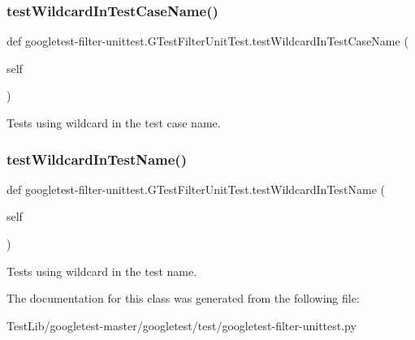 \subsubsection{\texorpdfstring{test\+Wildcard\+In\+Test\+Case\+Name()}{testWildcardInTestCaseName()}}
{\footnotesize\ttfamily def googletest-\/filter-\/unittest.\+G\+Test\+Filter\+Unit\+Test.\+test\+Wildcard\+In\+Test\+Case\+Name (\begin{DoxyParamCaption}\item[{}]{self }\end{DoxyParamCaption})}

\begin{DoxyVerb}Tests using wildcard in the test case name.\end{DoxyVerb}
 \mbox{\label{classgoogletest-filter-unittest_1_1GTestFilterUnitTest_a57c51a39e4e5578dc6e0a0dd47c2875c}} 
\subsubsection{\texorpdfstring{test\+Wildcard\+In\+Test\+Name()}{testWildcardInTestName()}}
{\footnotesize\ttfamily def googletest-\/filter-\/unittest.\+G\+Test\+Filter\+Unit\+Test.\+test\+Wildcard\+In\+Test\+Name (\begin{DoxyParamCaption}\item[{}]{self }\end{DoxyParamCaption})}

\begin{DoxyVerb}Tests using wildcard in the test name.\end{DoxyVerb}
 

The documentation for this class was generated from the following file\+:\begin{DoxyCompactItemize}
\item 
Test\+Lib/googletest-\/master/googletest/test/googletest-\/filter-\/unittest.\+py\end{DoxyCompactItemize}
